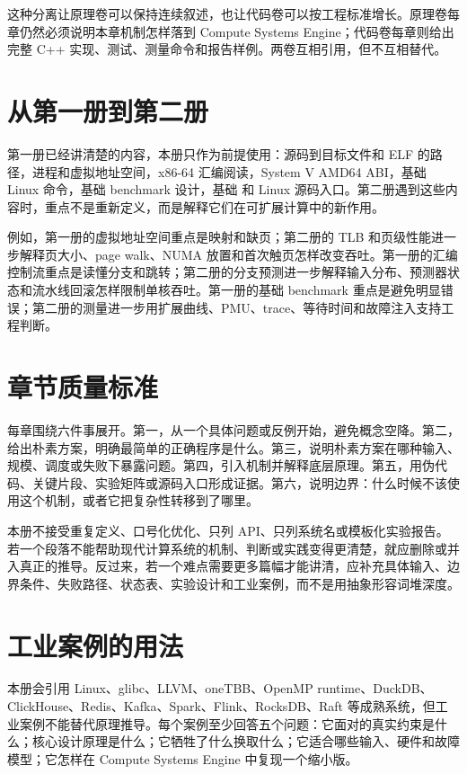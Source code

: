 这种分离让原理卷可以保持连续叙述，也让代码卷可以按工程标准增长。原理卷每章仍然必须说明本章机制怎样落到 Compute Systems Engine；代码卷每章则给出完整 C++ 实现、测试、测量命令和报告样例。两卷互相引用，但不互相替代。

\section*{从第一册到第二册}

第一册已经讲清楚的内容，本册只作为前提使用：源码到目标文件和 ELF 的路径，进程和虚拟地址空间，x86-64 汇编阅读，System V AMD64 ABI，基础 Linux 命令，基础 benchmark 设计，基础  和 Linux 源码入口。第二册遇到这些内容时，重点不是重新定义，而是解释它们在可扩展计算中的新作用。

例如，第一册的虚拟地址空间重点是映射和缺页；第二册的 TLB 和页级性能进一步解释页大小、page walk、NUMA 放置和首次触页怎样改变吞吐。第一册的汇编控制流重点是读懂分支和跳转；第二册的分支预测进一步解释输入分布、预测器状态和流水线回滚怎样限制单核吞吐。第一册的基础 benchmark 重点是避免明显错误；第二册的测量进一步用扩展曲线、PMU、trace、等待时间和故障注入支持工程判断。

\section*{章节质量标准}

每章围绕六件事展开。第一，从一个具体问题或反例开始，避免概念空降。第二，给出朴素方案，明确最简单的正确程序是什么。第三，说明朴素方案在哪种输入、规模、调度或失败下暴露问题。第四，引入机制并解释底层原理。第五，用伪代码、关键片段、实验矩阵或源码入口形成证据。第六，说明边界：什么时候不该使用这个机制，或者它把复杂性转移到了哪里。

本册不接受重复定义、口号化优化、只列 API、只列系统名或模板化实验报告。若一个段落不能帮助现代计算系统的机制、判断或实践变得更清楚，就应删除或并入真正的推导。反过来，若一个难点需要更多篇幅才能讲清，应补充具体输入、边界条件、失败路径、状态表、实验设计和工业案例，而不是用抽象形容词堆深度。

\section*{工业案例的用法}

本册会引用 Linux、glibc、LLVM、oneTBB、OpenMP runtime、DuckDB、ClickHouse、Redis、Kafka、Spark、Flink、RocksDB、Raft 等成熟系统，但工业案例不能替代原理推导。每个案例至少回答五个问题：它面对的真实约束是什么；核心设计原理是什么；它牺牲了什么换取什么；它适合哪些输入、硬件和故障模型；它怎样在 Compute Systems Engine 中复现一个缩小版。

